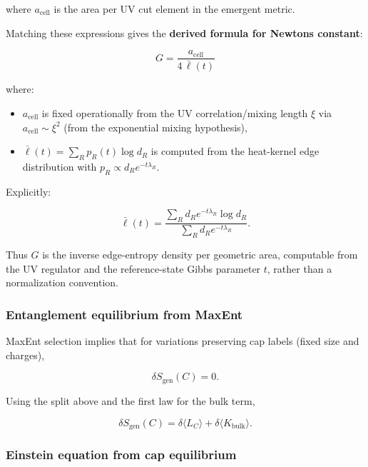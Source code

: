 where \(a_{\mathrm{cell}}\) is the area per UV cut element in the emergent metric.

Matching these expressions gives the \textbf{derived formula for Newton\textquotesingle s constant}:

\[
G = \frac{a_{\mathrm{cell}}}{4 \, \bar{\ell}(t)}
\]

where:

\begin{itemize}
\tightlist
\item
  \(a_{\mathrm{cell}}\) is fixed operationally from the UV correlation/mixing length \(\xi\) via \(a_{\mathrm{cell}} \sim \xi^2\) (from the exponential mixing hypothesis),
\item
  \(\bar{\ell}(t) = \sum_R p_R(t) \log d_R\) is computed from the heat-kernel edge distribution with \(p_R \propto d_R e^{-t\lambda_R}\).
\end{itemize}

Explicitly:

\[
\bar{\ell}(t) = \frac{\sum_R d_R e^{-t\lambda_R} \log d_R}{\sum_R d_R e^{-t\lambda_R}}.
\]

Thus \(G\) is the inverse edge-entropy density per geometric area, computable from the UV regulator and the reference-state Gibbs parameter \(t\), rather than a normalization convention.

\subsubsection{Entanglement equilibrium from MaxEnt}\label{55-entanglement-equilibrium-from-maxent}

MaxEnt selection implies that for variations preserving cap labels (fixed size and charges),

\[
\delta S_{\mathrm{gen}}(C) = 0.
\]

Using the split above and the first law for the bulk term,

\[
\delta S_{\mathrm{gen}}(C) = \delta \langle L_C \rangle + \delta \langle K_{\mathrm{bulk}} \rangle.
\]

\subsubsection{Einstein equation from cap equilibrium}\label{56-einstein-equation-from-cap-equilibrium}

